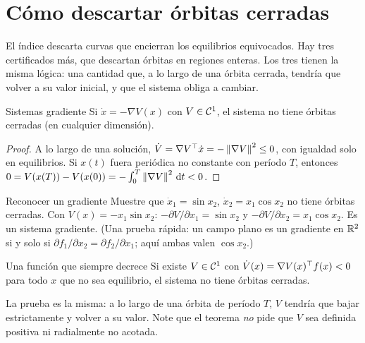 \section{Cómo descartar órbitas cerradas}
\label{sec:oc-descartar}

El índice descarta curvas que encierran los equilibrios equivocados. Hay tres certificados más, que descartan órbitas en regiones enteras. Los tres tienen la misma lógica: una cantidad que, a lo largo de una órbita cerrada, tendría que volver a su valor inicial, y que el sistema obliga a cambiar.

\begin{teorema}[label=thm:oc-gradiente]{Sistemas gradiente}
Si $\dot x=-\nabla V(x)$ con $V\in\mathcal{C}^{1}$, el sistema no tiene órbitas cerradas (en cualquier dimensión).
\end{teorema}

\begin{proof}
A lo largo de una solución, $\dot V=\nabla V^{\top}\dot x=-\left\lVert \nabla V\right\rVert^2\le0$, con igualdad solo en equilibrios. Si $x(t)$ fuera periódica no constante con período $T$, entonces $0=V(x(T))-V(x(0))=-\int_0^T\left\lVert \nabla V\right\rVert^2\,\mathrm{d} t<0$.
\end{proof}

\begin{ejemplo}[label=ej:oc-gradiente]{Reconocer un gradiente}
Muestre que $\dot x_1=\sin x_2$, $\dot x_2=x_1\cos x_2$ no tiene órbitas cerradas.
\solucion Con $V(x)=-x_1\sin x_2$: $-\partial V/\partial x_1=\sin x_2$ y $-\partial V/\partial x_2=x_1\cos x_2$. Es un sistema gradiente. (Una prueba rápida: un campo plano es un gradiente en $\mathbb{R}^2$ si y solo si $\partial f_1/\partial x_2=\partial f_2/\partial x_1$; aquí ambas valen $\cos x_2$.)
\end{ejemplo}

\begin{teorema}[label=thm:oc-lyapunov]{Una función que siempre decrece}
Si existe $V\in\mathcal{C}^{1}$ con $\dot V(x)=\nabla V(x)^{\top} f(x)<0$ para todo $x$ que no sea equilibrio, el sistema no tiene órbitas cerradas.
\end{teorema}

\noindent La prueba es la misma: a lo largo de una órbita de período $T$, $V$ tendría que bajar estrictamente y volver a su valor. Note que el teorema \emph{no} pide que $V$ sea definida positiva ni radialmente no acotada.

